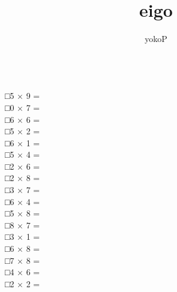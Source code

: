 \documentclass[uplatex,
paper=a4,
fontsize=18pt,
jafontsize=16pt,
number_of_lines=30,
line_length=30zh,
baselineskip=25pt,
]{jlreq}
\author{yokoP}
\title{eigo}
\begin{document}
\begin{multicols}{3}
\\

□\hspace{1em}5 × 9 = 
\\

□\hspace{1em}0 × 7 = 
\\

□\hspace{1em}6 × 6 = 
\\

□\hspace{1em}5 × 2 = 
\\

□\hspace{1em}6 × 1 = 
\\

□\hspace{1em}5 × 4 = 
\\

□\hspace{1em}2 × 6 = 
\\

□\hspace{1em}2 × 8 = 
\\

□\hspace{1em}3 × 7 = 
\\

□\hspace{1em}6 × 4 = 
\\

□\hspace{1em}5 × 8 = 
\\

□\hspace{1em}8 × 7 = 
\\

□\hspace{1em}3 × 1 = 
\\

□\hspace{1em}6 × 8 = 
\\

□\hspace{1em}7 × 8 = 
\\

□\hspace{1em}4 × 6 = 
\\

□\hspace{1em}2 × 2 = 
\\


\end{multicols}
\end{document}
